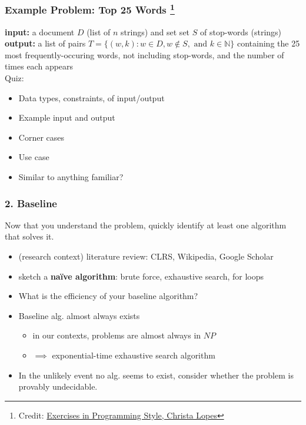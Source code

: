 \documentclass{beamer}
\begin{document}
\begin{frame} \frametitle{Example Problem: Top 25 Words \footnote{Credit: \href{https://www.crcpress.com/Exercises-in-Programming-Style/Lopes/p/book/9781482227376}{Exercises in Programming Style, Christa Lopes}}}
\textbf{input:} a document $D$ (list of $n$ strings) and set
  set $S$ of stop-words (strings) \\
\textbf{output:} a list of pairs
  $T=\{(w, k) : w \in D, w \notin S, \text{ and } k \in \mathbb{N} \}$
  containing the 25 most frequently-occuring words, not including stop-words,
  and the number of times each appears \\
\vspace{12pt}
  Quiz:
  \begin{itemize}
    \item Data types, constraints, of input/output
    \item Example input and output
    \item Corner cases
    \item Use case
    \item Similar to anything familiar?
  \end{itemize}

\end{frame}

\begin{frame} \frametitle{2. Baseline}
Now that you understand the problem, quickly identify at least one algorithm
that solves it.
\begin{itemize}
  \item (research context) literature review: CLRS, Wikipedia, Google Scholar
  \item sketch a \textbf{na\"{i}ve algorithm}: brute force, exhaustive search,
    for loops
  \item What is the efficiency of your baseline algorithm?
  \item Baseline alg. almost always exists
    \begin{itemize}
      \item in our contexts, problems are almost always in $NP$
      \item $\implies$ exponential-time exhaustive search algorithm
    \end{itemize}
  \item In the unlikely event no alg. seems to exist, consider whether the
    problem is provably undecidable.
\end{itemize}
\end{frame}
\end{document}
